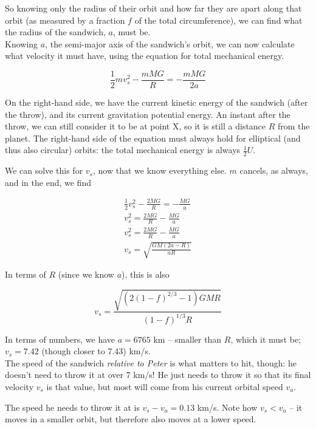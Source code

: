 \documentclass[8.01x]{subfiles}
\begin{document}
So knowing only the radius of their orbit and how far they are apart along that orbit (as measured by a fraction $f$ of the total circumference), we can find what the radius of the sandwich, $a$, must be.\\
Knowing $a$, the semi-major axis of the sandwich's orbit, we can now calculate what velocity it must have, using the equation for total mechanical energy.

\begin{equation}
\frac{1}{2} m v_s^2 - \frac{m M G}{R} = -\frac{m M G}{2a}
\end{equation}

On the right-hand side, we have the current kinetic energy of the sandwich (after the throw), and its current gravitation potential energy. An instant after the throw, we can still consider it to be at point X, so it is still a distance $R$ from the planet. The right-hand side of the equation must always hold for elliptical (and thus also circular) orbits: the total mechanical energy is always $\displaystyle \frac{1}{2} U$.

We can solve this for $v_s$, now that we know everything else. $m$ cancels, as always, and in the end, we find

\begin{align}
\frac{1}{2} v_s^2 - \frac{2 M G}{R} = -\frac{M G}{a}\\
v_s^2 = \frac{2 M G}{R} - \frac{M G}{a}\\
v_s^2 = \frac{2 M G}{R} - \frac{M G}{a}\\
v_s = \sqrt{\frac{G M (2 a - R)}{a R}}
\end{align}

In terms of $R$ (since we know $a$), this is also

\begin{equation}
v_s = \frac{\sqrt{(2(1-f)^{2/3} - 1) G M R}}{(1 - f)^{1/3} R}
\end{equation}

In terms of numbers, we have $a = 6765$ km -- smaller than $R$, which it must be; $v_s = 7.42$ (though closer to 7.43) km/s.\\
The speed of the sandwich \emph{relative to Peter} is what matters to hit, though: he doesn't need to throw it at over 7 km/s! He just needs to throw it so that its final velocity $v_s$ is that value, but most will come from his current orbital speed $v_a$.

The speed he needs to throw it at is $v_s - v_a = 0.13$ km/s. Note how $v_s < v_a$ -- it moves in a smaller orbit, but therefore also moves at a lower speed.
\end{document}
